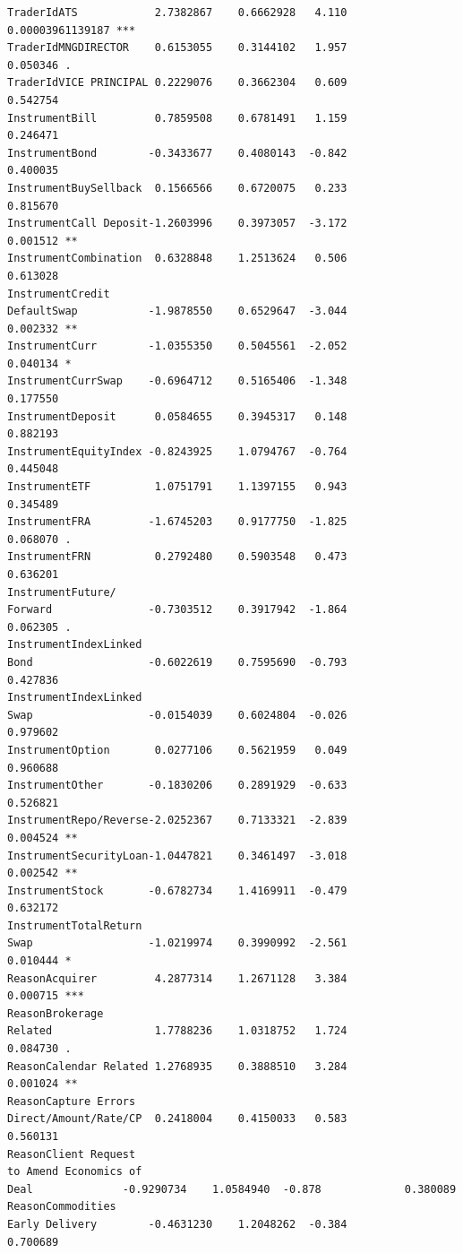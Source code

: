 \documentclass{DissertateUSU}
\begin{document}
\begin{verbatim}
TraderIdATS            2.7382867    0.6662928   4.110     0.00003961139187 ***
TraderIdMNGDIRECTOR    0.6153055    0.3144102   1.957             0.050346 .  
TraderIdVICE PRINCIPAL 0.2229076    0.3662304   0.609             0.542754    
InstrumentBill         0.7859508    0.6781491   1.159             0.246471    
InstrumentBond        -0.3433677    0.4080143  -0.842             0.400035    
InstrumentBuySellback  0.1566566    0.6720075   0.233             0.815670    
InstrumentCall Deposit-1.2603996    0.3973057  -3.172             0.001512 ** 
InstrumentCombination  0.6328848    1.2513624   0.506             0.613028    
InstrumentCredit
DefaultSwap           -1.9878550    0.6529647  -3.044             0.002332 ** 
InstrumentCurr        -1.0355350    0.5045561  -2.052             0.040134 *  
InstrumentCurrSwap    -0.6964712    0.5165406  -1.348             0.177550    
InstrumentDeposit      0.0584655    0.3945317   0.148             0.882193    
InstrumentEquityIndex -0.8243925    1.0794767  -0.764             0.445048    
InstrumentETF          1.0751791    1.1397155   0.943             0.345489    
InstrumentFRA         -1.6745203    0.9177750  -1.825             0.068070 .  
InstrumentFRN          0.2792480    0.5903548   0.473             0.636201    
InstrumentFuture/
Forward               -0.7303512    0.3917942  -1.864             0.062305 .  
InstrumentIndexLinked
Bond                  -0.6022619    0.7595690  -0.793             0.427836    
InstrumentIndexLinked
Swap                  -0.0154039    0.6024804  -0.026             0.979602    
InstrumentOption       0.0277106    0.5621959   0.049             0.960688    
InstrumentOther       -0.1830206    0.2891929  -0.633             0.526821    
InstrumentRepo/Reverse-2.0252367    0.7133321  -2.839             0.004524 ** 
InstrumentSecurityLoan-1.0447821    0.3461497  -3.018             0.002542 ** 
InstrumentStock       -0.6782734    1.4169911  -0.479             0.632172    
InstrumentTotalReturn
Swap                  -1.0219974    0.3990992  -2.561             0.010444 *  
ReasonAcquirer         4.2877314    1.2671128   3.384             0.000715 ***
ReasonBrokerage 
Related                1.7788236    1.0318752   1.724             0.084730 .  
ReasonCalendar Related 1.2768935    0.3888510   3.284             0.001024 ** 
ReasonCapture Errors    
Direct/Amount/Rate/CP  0.2418004    0.4150033   0.583             0.560131  
ReasonClient Request
to Amend Economics of
Deal              -0.9290734    1.0584940  -0.878             0.380089   
ReasonCommodities
Early Delivery        -0.4631230    1.2048262  -0.384             0.700689    

\end{verbatim}
\end{document}
